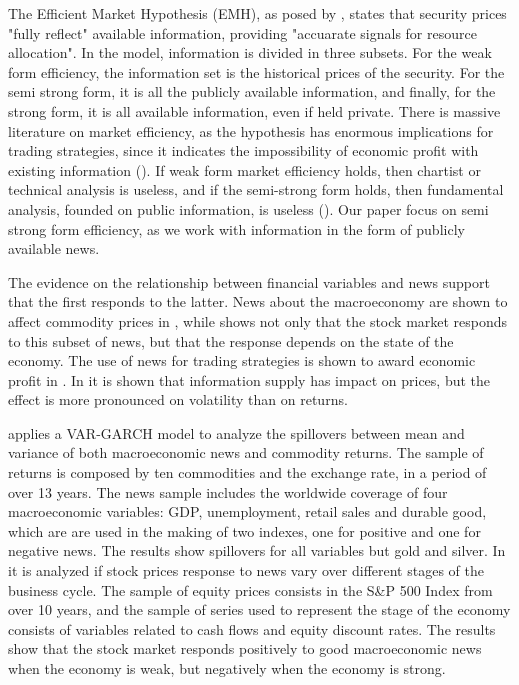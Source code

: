 \documentclass[cic,tc, english]{iiufrgs}
\begin{document}
    The Efficient Market Hypothesis (EMH), as posed by \citet{fama1970}, states that security prices "fully reflect" available information, providing "accuarate signals for resource allocation". In the model, information is divided in three subsets. For the weak form efficiency, the information set is the historical prices of the security. For the semi strong form, it is all the publicly available information, and finally, for the strong form, it is all available information, even if held private. There is massive literature on market efficiency, as the hypothesis has enormous implications for trading strategies, since it indicates the impossibility of economic profit with existing information (\citet{kamal2014}). If weak form market efficiency holds, then chartist or technical analysis is useless, and if the semi-strong form holds, then fundamental analysis, founded on public information, is useless (\citet{oprean2012}). Our paper focus on semi strong form efficiency, as we work with information in the form of publicly available news.

    The evidence on the relationship between financial variables and news support that the first responds to the latter. News about the macroeconomy are shown to affect commodity prices in \citet{caporaleetal2015}, while \citet{macqueenroley1993} shows not only that the stock market responds to this subset of news, but that the response depends on the state of the economy. The use of news for trading strategies is shown to award economic profit in \citet{larsenthorsrud2017}. In \citet{moussaetal2017} it is shown that information supply has impact on prices, but the effect is more pronounced on volatility than on returns.

    \citet{caporaleetal2015} applies a VAR-GARCH model to analyze the spillovers between mean and variance of both macroeconomic news and commodity returns. The sample of returns is composed by ten commodities and the exchange rate, in a period of over 13 years. The news sample includes the worldwide coverage of four macroeconomic variables: GDP, unemployment, retail sales and durable good, which are are used in the making of two indexes, one for positive and one for negative news. The results show spillovers for all variables but gold and silver.
    In \citet{macqueenroley1993} it is analyzed if stock prices response to news vary over different stages of the business cycle. The sample of equity prices consists in the S\&P 500 Index from over 10 years, and the sample of series used to represent the stage of the economy consists of variables related to cash flows and equity discount rates. The results show that the stock market responds positively to good macroeconomic news when the economy is weak, but negatively when the economy is strong.
\end{document}
